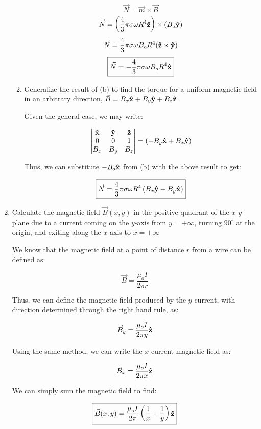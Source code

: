 \begin{enumerate}
\begin{enumerate}
        $$\vec{N}=\vec{m}\times\vec{B}$$
        $$\vec{N}=\left( \frac{4}{3}\pi\sigma\omega R^4\bold{\hat{z}}\right)\times(B_o\bold{\hat{y}})$$
        $$\vec{N}=\frac{4}{3}\pi\sigma\omega B_o R^4(\bold{\hat{z}}\times\bold{\hat{y}})$$
        $$\boxed{\vec{N}=-\frac{4}{3}\pi\sigma\omega B_o R^4\bold{\hat{x}}}$$

      \item Generalize the result of (b) to find the torque for a uniform magnetic field in an arbitrary direction, $\vec{B}=B_x\bold{\hat{x}}+B_y\bold{\hat{y}}+B_z\bold{\hat{z}}$

        Given the general case, we may write:

        $$\left|\begin{matrix} \bold{\hat{x}} & \bold{\hat{y}} & \bold{\hat{z}}\\ 0 & 0 & 1\\ B_x & B_y & B_z\end{matrix}\right|=(-B_y\bold{\hat{x}}+B_x\bold{\hat{y}})$$

        Thus, we can substitute $-B_o\bold{\hat{x}}$ from (b) with the above result to get:

        $$\boxed{\vec{N}=\frac{4}{3}\pi\sigma\omega R^4\left( B_x\bold{\hat{y}}-B_y\bold{\hat{x}} \right)}$$

    \end{enumerate}

  \item Calculate the magnetic field $\vec{B}(x,y)$ in the positive quadrant of the $x$-$y$ plane due to a current coming on the $y$-axis from $y=+\infty$, turning $90^{\circ}$ at the origin, and exiting along the $x$-axis to $x=+\infty$

    We know that the magnetic field at a point of distance $r$ from a wire can be defined as:

    $$\vec{B}=\frac{\mu_o I}{2\pi r}$$

    Thus, we can define the magnetic field produced by the $y$ current, with direction determined through the right hand rule, as:

    $$\vec{B}_y=\frac{\mu_o I}{2\pi y}\bold{\hat{z}}$$

    Using the same method, we can write the $x$ current magnetic field as:

    $$\vec{B}_x=\frac{\mu_o I}{2\pi x}\bold{\hat{z}}$$

    We can simply sum the magnetic field to find:

    $$\boxed{\vec{B}(x,y)=\frac{\mu_o I}{2\pi}\left( \frac{1}{x}+\frac{1}{y} \right)\bold{\hat{z}}}$$


\end{enumerate}
